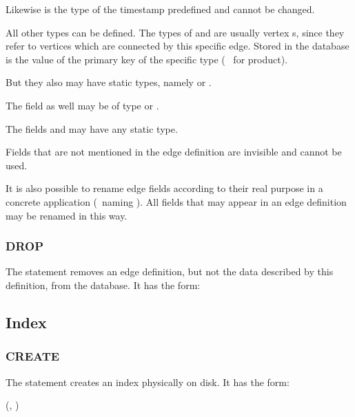 Likewise is the type of the timestamp predefined
and cannot be changed.

All other types can be defined.
The types of  and 
are usually vertex s, since they refer
to vertices which are connected by this specific edge.
Stored in the database is the value of the primary key
of the specific type (\ie\  for product).

But they also may have static types, namely
 or .

The field  as well may be of type
 or .

The fields  and 
may have any static type.

Fields that are not mentioned in the edge definition
are invisible and cannot be used.


It is also possible to rename edge fields
according to their real purpose in a concrete
application (\eg\ naming  ).
All fields that may appear in an edge definition
may be renamed in this way.

\subsubsection{DROP}
The  statement removes an edge definition,
but not the data described by this definition,
from the database.
It has the form:

 

\subsection{Index}
\subsubsection{CREATE}
The  statement
creates an index physically on disk.
It has the form:

   
(, )

